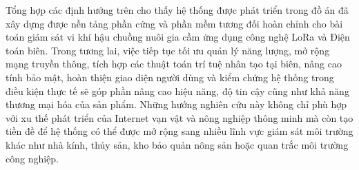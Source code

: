 Tổng hợp các định hướng trên cho thấy hệ thống được phát triển trong đồ án đã xây dựng được nền tảng phần cứng và phần mềm tương đối hoàn chỉnh cho bài toán giám sát vi khí hậu chuồng nuôi gia cầm ứng dụng công nghệ LoRa và Điện toán biên. Trong tương lai, việc tiếp tục tối ưu quản lý năng lượng, mở rộng mạng truyền thông, tích hợp các thuật toán trí tuệ nhân tạo tại biên, nâng cao tính bảo mật, hoàn thiện giao diện người dùng và kiểm chứng hệ thống trong điều kiện thực tế sẽ góp phần nâng cao hiệu năng, độ tin cậy cũng như khả năng thương mại hóa của sản phẩm. Những hướng nghiên cứu này không chỉ phù hợp với xu thế phát triển của Internet vạn vật và nông nghiệp thông minh mà còn tạo tiền đề để hệ thống có thể được mở rộng sang nhiều lĩnh vực giám sát môi trường khác như nhà kính, thủy sản, kho bảo quản nông sản hoặc quan trắc môi trường công nghiệp.
